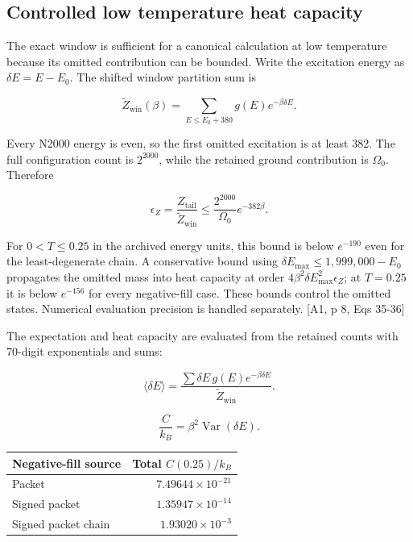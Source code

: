 \subsection{Controlled low temperature heat capacity}\label{controlled-low-temperature-heat-capacity}

The exact window is sufficient for a canonical calculation at low temperature because its omitted contribution can be bounded. Write the excitation energy as \(\delta E=E-E_0\). The shifted window partition sum is

\[\widetilde Z_{\mathrm{win}}(\beta)=\sum_{E\leq E_0+380}g(E)e^{-\beta\delta E}.\]

Every N2000 energy is even, so the first omitted excitation is at least 382. The full configuration count is \(2^{2000}\), while the retained ground contribution is \(\Omega_0\). Therefore

\[\epsilon_Z=\frac{Z_{\mathrm{tail}}}{\widetilde Z_{\mathrm{win}}}\leq\frac{2^{2000}}{\Omega_0}e^{-382\beta}.\]

For \(0<T\leq0.25\) in the archived energy units, this bound is below \(e^{-190}\) even for the least-degenerate chain. A conservative bound using \(\delta E_{\max}\leq1,999,000-E_0\) propagates the omitted mass into heat capacity at order \(4\beta^2\delta E_{\max}^2\epsilon_Z\); at \(T=0.25\) it is below \(e^{-156}\) for every negative-fill case. These bounds control the omitted states. Numerical evaluation precision is handled separately. {[}A1, p 8, Eqs 35-36{]}

The expectation and heat capacity are evaluated from the retained counts with 70-digit exponentials and sums:

\[\langle\delta E\rangle=\frac{\sum\delta E\,g(E)e^{-\beta\delta E}}{\widetilde Z_{\mathrm{win}}}.\]

\[\frac{C}{k_B}=\beta^2\operatorname{Var}(\delta E).\]

\begin{table}[htbp]\centering\scriptsize
\begin{tabular}{@{}lr@{}}
\toprule
Negative-fill source & Total \(C(0.25)/k_B\) \\
\midrule
Packet & \(7.49644\times10^{-21}\) \\
Signed packet & \(1.35947\times10^{-14}\) \\
Signed packet chain & \(1.93020\times10^{-3}\) \\
\bottomrule
\end{tabular}
\end{table}

